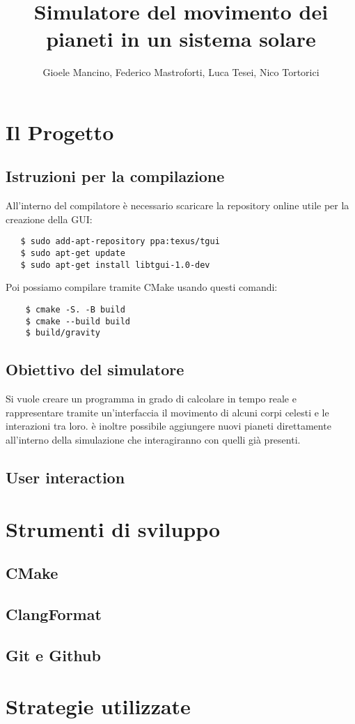 \documentclass{article}
\title{Simulatore del movimento dei pianeti in un sistema solare}
\author{Gioele Mancino, Federico Mastroforti, Luca Tesei, Nico Tortorici}
\begin{document}
\maketitle
\section{Il Progetto}
\subsection{Istruzioni per la compilazione}
All'interno del compilatore è necessario scaricare la repository online utile per la creazione della GUI:
\begin{verbatim}
   $ sudo add-apt-repository ppa:texus/tgui
   $ sudo apt-get update
   $ sudo apt-get install libtgui-1.0-dev
    \end{verbatim}
Poi possiamo compilare tramite CMake usando questi comandi:
\begin{verbatim}
    $ cmake -S. -B build
    $ cmake --build build
    $ build/gravity
     \end{verbatim} 

\subsection{Obiettivo del simulatore}
Si vuole creare un programma in grado di calcolare in tempo reale e rappresentare tramite
un'interfaccia il movimento di alcuni corpi celesti e le interazioni tra loro. è inoltre possibile aggiungere nuovi pianeti direttamente all'interno della simulazione che interagiranno con quelli già presenti.

\subsection{User interaction}
\section{Strumenti di sviluppo}
\subsection{CMake}
\subsection{ClangFormat}
\subsection{Git e Github}
\section{Strategie utilizzate}
\end{document}
